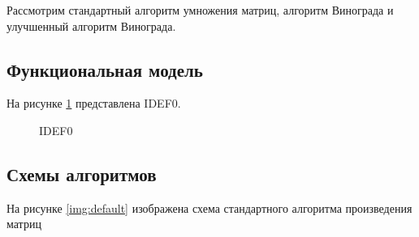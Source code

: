 \documentclass[a4paper,12pt]{article}
\begin{document}
Рассмотрим стандартный алгоритм умножения матриц, алгоритм Винограда и улучшенный
алгоритм Винограда.

\subsection{Функциональная модель}

На рисунке \ref{img:idef0} представлена IDEF0.

\begin{figure}[H]
    \caption{IDEF0}
    \label{img:idef0}
\end{figure}

\subsection{Схемы алгоритмов}

На рисунке \ref{img:default} изображена схема стандартного алгоритма произведения
матриц
\end{document}
